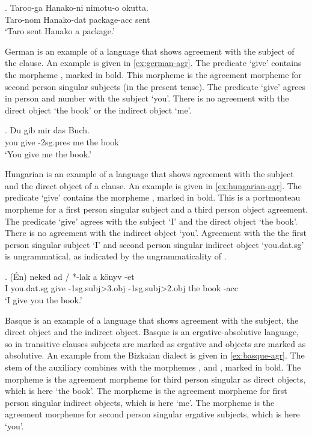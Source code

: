 \exg. Taroo-ga Hanako-ni nimotu-o okutta.\\
 Taro-\ac{nom} Hanako-\ac{dat} package-\ac{acc} sent\\
 `Taro sent Hanako a package.' \label{ex:japanese-agr}

German is an example of a language that shows agreement with the subject of the clause. An example is given in \ref{ex:german-agr}. The predicate  `give' contains the morpheme , marked in bold. This morpheme is the agreement morpheme for second person singular subjects (in the present tense). The predicate  `give' agrees in person and number with the subject  `you'. There is no agreement with the direct object  `the book' or the indirect object  `me'.

\exg. Du gib  mir das Buch.\\
 you give -2\ac{sg}.\ac{pres} me the book\\
 `You give me the book.' \label{ex:german-agr}

Hungarian is an example of a language that shows agreement with the subject and the direct object of a clause. An example is given in \ref{ex:hungarian-agr}. The predicate  `give' contains the morpheme , marked in bold. This is a portmonteau morpheme for a first person singular subject and a third person object agreement. The predicate  `give' agrees with the subject  `I' and the direct object  `the book'. There is no agreement with the indirect object  `you'. Agreement with the the first person singular subject  `I' and second person singular indirect object  `you.\ac{dat}.\ac{sg}' is ungrammatical, as indicated by the ungrammaticality of .

\exg. (Én) neked ad / *-lak a könyv -et\\
 I you.\ac{dat}.\ac{sg} give -1\ac{sg}.\ac{subj}>3.\ac{obj} -1\ac{sg}.\ac{subj}>2.\ac{obj} the book -\ac{acc}\\
 `I give you the book.' \label{ex:hungarian-agr}

Basque is an example of a language that shows agreement with the subject, the direct object and the indirect object. Basque is an ergative-absolutive language, so in transitive clauses subjects are marked as ergative and objects are marked as absolutive. An example from the Bizkaian dialect is given in \ref{ex:basque-agr}. The stem of the auxiliary  combines with the morphemes ,  and , marked in bold. The morpheme  is the agreement morpheme for third person singular as direct objects, which is here  `the book'. The morpheme  is the agreement morpheme for first person singular indirect objects, which is here  `me'. The morpheme  is the agreement morpheme for second person singular ergative subjects, which is here  `you'.

